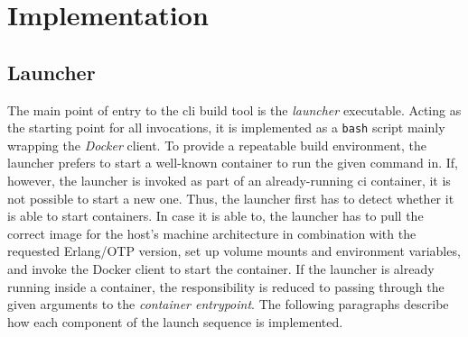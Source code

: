 \section{Implementation}

\subsection{Launcher} The main point of entry to the \acrshort{cli} build tool is the \emph{launcher} executable. Acting as the starting point for all invocations, it is implemented as a \lstinline|bash| script mainly wrapping the \emph{Docker} client. To provide a repeatable build environment, the launcher prefers to start a well-known container to run the given command in. If, however, the launcher is invoked as part of an already-running \acrshort{ci} container, it is not possible to start a new one. Thus, the launcher first has to detect whether it is able to start containers. In case it is able to, the launcher has to pull the correct image for the host's machine architecture in combination with the requested Erlang/OTP version, set up volume mounts and environment variables, and invoke the Docker client to start the container. If the launcher is already running inside a container, the responsibility is reduced to passing through the given arguments to the \emph{container entrypoint}. The following paragraphs describe how each component of the launch sequence is implemented.

